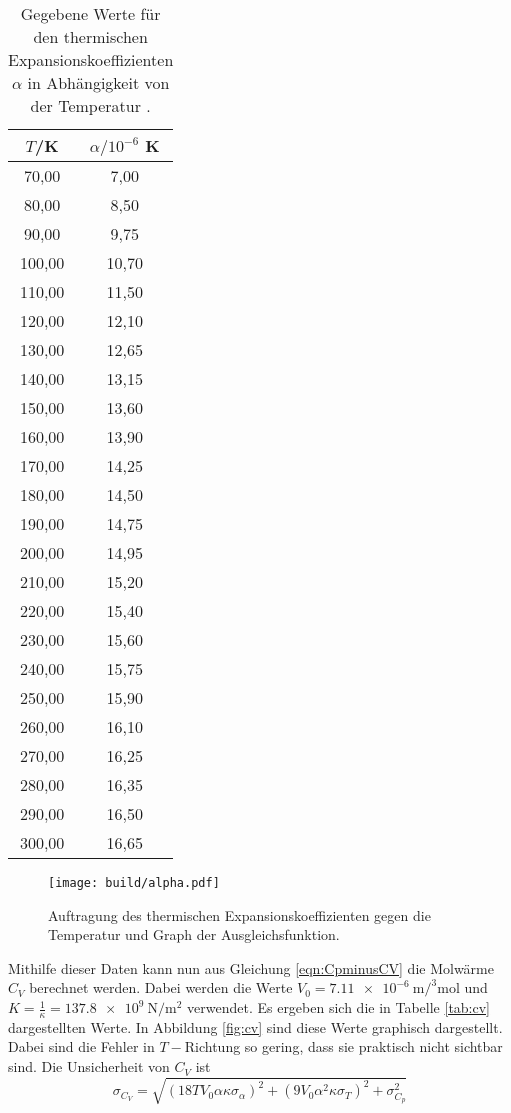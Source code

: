 \begin{table}[htp]
	\begin{center}
    \caption{Gegebene Werte für den thermischen Expansionskoeffizienten $\alpha$ in Abhängigkeit von der
    Temperatur \cite{versuchsanleitung}.}
    \label{tab:alpha}
		\begin{tabular}{cc}
		\toprule
			{$T$/K} & {$\alpha/10^{-6}$ K}\\
			\midrule
			70,00 & 7,00\\
			80,00 & 8,50\\
			90,00 & 9,75\\
			100,00 & 10,70\\
			110,00 & 11,50\\
			120,00 & 12,10\\
			130,00 & 12,65\\
			140,00 & 13,15\\
			150,00 & 13,60\\
			160,00 & 13,90\\
			170,00 & 14,25\\
			180,00 & 14,50\\
			190,00 & 14,75\\
			200,00 & 14,95\\
			210,00 & 15,20\\
			220,00 & 15,40\\
			230,00 & 15,60\\
			240,00 & 15,75\\
			250,00 & 15,90\\
			260,00 & 16,10\\
			270,00 & 16,25\\
			280,00 & 16,35\\
			290,00 & 16,50\\
			300,00 & 16,65\\
		\bottomrule
		\end{tabular}
	\end{center}
\end{table}

\begin{figure}
  \centering
  \texttt{[image: build/alpha.pdf]}
  \caption{Auftragung des thermischen Expansionskoeffizienten gegen die Temperatur und Graph der
  Ausgleichsfunktion.}
  \label{fig:alpha}
\end{figure}

Mithilfe dieser Daten kann nun aus Gleichung \eqref{eqn:CpminusCV} die Molwärme $C_V$
berechnet werden. Dabei werden die Werte $V_0=\SI{7.11e-6}{\metre\cubic\per\mole}$
\cite{molvolumen} und $K=\frac{1}{\kappa}=\SI{137.8e9}{\newton\per\metre\squared}$
\cite{kompressionsmodul} verwendet. Es ergeben sich die
in Tabelle \ref{tab:cv} dargestellten Werte. In Abbildung \ref{fig:cv} sind diese Werte
graphisch dargestellt. Dabei sind die Fehler in $T-$Richtung so gering, dass sie praktisch
nicht sichtbar sind.
Die Unsicherheit von $C_V$ ist
\begin{equation*}
  \sigma_{C_V} = \sqrt{(18 T V_0 \alpha \kappa \sigma_\alpha)^2 + (9 V_0 \alpha^2 \kappa \sigma_T)^2 + \sigma_{C_{p}}^{2}}
\end{equation*}

